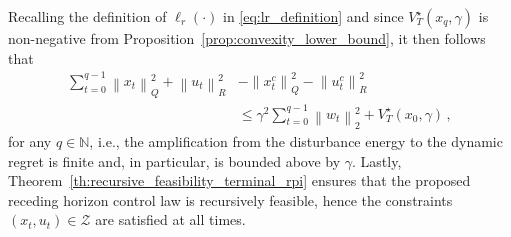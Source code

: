 \documentclass[conference]{IEEEtran}
\newcommand{\norm}[1]{\left\lVert#1\right\rVert}
\begin{document}
    Recalling the definition of $\ell_r(\cdot)$ in \eqref{eq:lr_definition} and since $V_T^\star(x_q, \gamma)$ is non-negative from Proposition~\ref{prop:convexity_lower_bound}, it then follows that
    \begin{align*}
        \sum_{t=0}^{q-1} \norm{x_t}_Q^2 + \norm{u_t}_R^2 &- \norm{x_t^c}^2_Q - \norm{u_t^c}^2_R \\
        &\leq \gamma^2 \sum_{t=0}^{q-1} \norm{w_t}_2^2 + V_T^\star(x_0, \gamma)\,,
    \end{align*}
    for any $q \in \mathbb{N}$, i.e., the amplification from the disturbance energy to the dynamic regret is finite and, in particular, is bounded above by $\gamma$. Lastly, Theorem~\ref{th:recursive_feasibility_terminal_rpi} ensures that the proposed receding horizon control law is recursively feasible, hence the constraints $(x_t, u_t) \in \mathcal{Z}$ are satisfied at all times.
\end{document}

